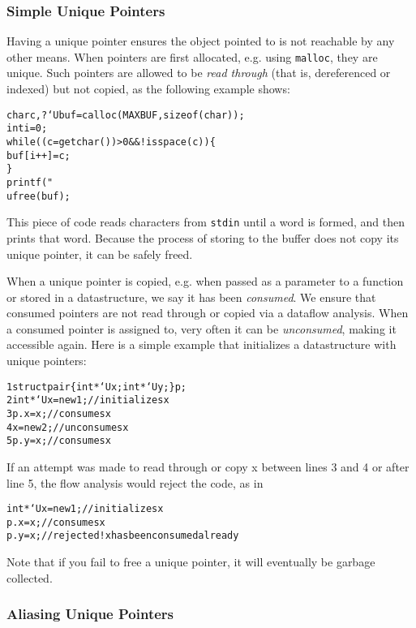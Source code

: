 \subsubsection{Simple Unique Pointers}

Having a unique pointer ensures the object pointed to is not reachable by
any other means.  When pointers are first allocated, e.g. using
\texttt{malloc}, they are unique.  Such pointers are allowed to be
\emph{read through} (that is, dereferenced or indexed) but not copied, as
the following example shows:
\begin{alltt}
  char c, ?`U buf = calloc(MAXBUF,sizeof(char));
  int i = 0;
  while ((c = getchar()) > 0 && !isspace(c)) \{
    buf[i++] = c;
  \}
  printf("%s",buf);
  ufree(buf);
\end{alltt}
This piece of code reads characters from \texttt{stdin} until a word is
formed, and then prints that word.  Because the process of storing to the
buffer does not copy its unique pointer, it can be safely freed.

When a unique pointer is copied, e.g. when passed as a parameter to a
function or stored in a datastructure, we say it has been \emph{consumed}.
We ensure that consumed pointers are not read through or copied via a
dataflow analysis.  When a consumed pointer is assigned to, very often it
can be \emph{unconsumed}, making it accessible again.  Here is a simple
example that initializes a datastructure with unique pointers:
\begin{alltt}
{\small 1}  struct pair \{ int *`U x; int *`U y; \} p;
{\small 2}  int *`U x = new 1;  // initializes x
{\small 3}  p.x = x;            // consumes x
{\small 4}  x = new 2;          // unconsumes x
{\small 5}  p.y = x;            // consumes x
\end{alltt}
If an attempt was made to read through or copy x between lines 3 and 4 or
after line 5, the flow analysis would reject the code, as in
\begin{alltt}
  int *`U x = new 1;  // initializes x
  p.x = x;            // consumes x
  p.y = x;            // rejected! x has been consumed already
\end{alltt}

Note that if you fail to free a unique pointer, it will eventually be
garbage collected.


\subsubsection{Aliasing Unique Pointers}

